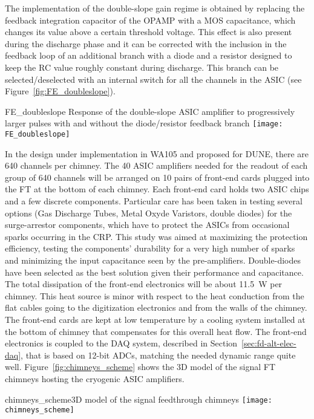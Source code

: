 The implementation of the double-slope gain regime is obtained by
replacing the feedback integration capacitor of the OPAMP with a MOS
capacitance, which changes its value above a certain threshold
voltage. This effect is also present during the discharge phase and it
can be corrected with the inclusion in the feedback loop of an
additional branch with a diode and a resistor designed to keep the RC
value roughly constant during discharge. This branch can be
selected/deselected with an internal switch for all the channels in
the ASIC (see Figure~\ref{fig:FE_doubleslope}).
\begin{cdrfigure}{FE_doubleslope}
{Response of the double-slope ASIC amplifier to progressively larger 
pulses with and without the diode/resistor feedback branch}
\texttt{[image: FE\_doubleslope]}
\end{cdrfigure}

In the design under implementation in WA105 and proposed for DUNE,
there are 640 channels per chimney. The 40 ASIC amplifiers needed for
the readout of each group of 640 channels will be arranged on 10 pairs
of front-end cards plugged into the FT at the bottom of each chimney.
Each front-end card holds two ASIC chips and a few discrete
components. Particular care has been taken in testing several options
(Gas Discharge Tubes, Metal Oxyde Varistors, double diodes) for the
surge-arrestor components, which have to protect the ASICs from
occasional sparks occurring in the CRP.  This study was aimed at
maximizing the protection efficiency, testing the components'
durability for a very high number of sparks and minimizing the input
capacitance seen by the pre-amplifiers. Double-diodes have been
selected as the best solution given their performance and
capacitance. The total dissipation of the front-end electronics will
be about 11.5~W per chimney. This heat source is minor with respect
to the heat conduction from the flat cables going to the digitization
electronics and from the walls of the chimney. The front-end cards are
kept at low temperature by a cooling system installed at the bottom of
chimney %
that compensates for this overall heat flow. The front-end
electronics is coupled to the DAQ system, described in Section~\ref{sec:fd-alt-elec-daq},
that is based on 12-bit ADCs, matching the needed dynamic
range quite well. Figure~\ref{fig:chimneys_scheme} shows the 3D model of the
signal FT chimneys hosting the cryogenic ASIC amplifiers.
\begin{cdrfigure}
{chimneys_scheme}{3D model of the signal feedthrough chimneys}
\texttt{[image: chimneys\_scheme]}
\end{cdrfigure}

